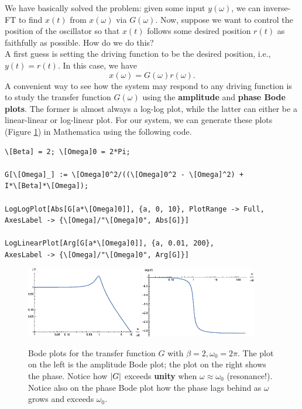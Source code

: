 \documentclass{article}
\theoremstyle{definition}
\begin{document}
We have basically solved the problem: given some input $y(\omega)$, we can inverse-FT to find $x(t)$ from $x(\omega)$ via $G(\omega)$. Now, suppose we want to control the position of the oscillator so that $x(t)$ follows some desired position $r(t)$ as faithfully as possible. How do we do this? \\


A first guess is setting the driving function to be the desired position, i.e., $y(t) = r(t)$. In this case, we have 
\begin{equation*}
x(\omega) = G(\omega) r(\omega).
\end{equation*}
A convenient way to see how the system may respond to any driving function is to study the transfer function $G(\omega)$ using the \textbf{amplitude} and \textbf{phase Bode plots}. The former is almost always a log-log plot, while the latter can either be a linear-linear or log-linear plot. For our system, we can generate these plots (Figure \ref{fig:bode_1}) in Mathematica using the following code. 

\begin{lstlisting}
\[Beta] = 2; \[Omega]0 = 2*Pi;

G[\[Omega]_] := \[Omega]0^2/((\[Omega]0^2 - \[Omega]^2) + 
I*\[Beta]*\[Omega]);

LogLogPlot[Abs[G[a*\[Omega]0]], {a, 0, 10}, PlotRange -> Full, 
AxesLabel -> {\[Omega]/"\[Omega]0", Abs[G]}]

LogLinearPlot[Arg[G[a*\[Omega]0]], {a, 0.01, 200}, 
AxesLabel -> {\[Omega]/"\[Omega]0", Arg[G]}]
\end{lstlisting}


\begin{figure}
	\centering
	\includegraphics[width=0.45\textwidth]{bode_1}
	\quad
	\includegraphics[width=0.45\textwidth]{bode_2}
	\caption{Bode plots for the transfer function $G$ with $\beta = 2,\omega_0 = 2\pi$. The plot on the left is the amplitude Bode plot; the plot on the right shows the phase. Notice how $\abs{G}$ exceeds \textbf{unity} when $\omega \approx \omega_0$ (resonance!). Notice also on the phase Bode plot how the phase lags behind as $\omega$ grows and exceeds $\omega_0$.}%
	\label{fig:bode_1}
\end{figure}
\end{document}

